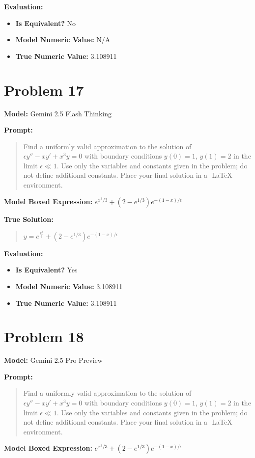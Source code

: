 \documentclass{article}
\begin{document}
\textbf{Evaluation:}
\begin{itemize}
\item \textbf{Is Equivalent?} No
\item \textbf{Model Numeric Value:} N/A
\item \textbf{True Numeric Value:} 3.108911
\end{itemize}
\vspace{1cm}
\section*{Problem 17}
\textbf{Model:} Gemini 2.5 Flash Thinking

\textbf{Prompt:}
\begin{quote}
Find a uniformly valid approximation to the solution of $\epsilon y'' - x y' + x^3 y = 0$ with boundary conditions $y(0) = 1$, $y(1) = 2$ in the limit $\epsilon \ll 1$. Use only the variables and constants given in the problem; do not define additional constants. Place your final solution in a $\boxed{}$ LaTeX environment.
\end{quote}
\textbf{Model Boxed Expression:} $e^{x^3/3} + (2-e^{1/3})e^{-(1-x)/\epsilon}$

\textbf{True Solution:}
\begin{quote}
$y = e^{\frac{x^3}{3}} + (2-e^{1/3})e^{-(1-x)/\epsilon}$
\end{quote}

\textbf{Evaluation:}
\begin{itemize}
\item \textbf{Is Equivalent?} Yes
\item \textbf{Model Numeric Value:} 3.108911
\item \textbf{True Numeric Value:} 3.108911
\end{itemize}
\vspace{1cm}
\section*{Problem 18}
\textbf{Model:} Gemini 2.5 Pro Preview

\textbf{Prompt:}
\begin{quote}
Find a uniformly valid approximation to the solution of $\epsilon y'' - x y' + x^3 y = 0$ with boundary conditions $y(0) = 1$, $y(1) = 2$ in the limit $\epsilon \ll 1$. Use only the variables and constants given in the problem; do not define additional constants. Place your final solution in a $\boxed{}$ LaTeX environment.
\end{quote}
\textbf{Model Boxed Expression:} $e^{x^3/3} + (2 - e^{1/3}) e^{-(1-x)/\epsilon}$
\end{document}
